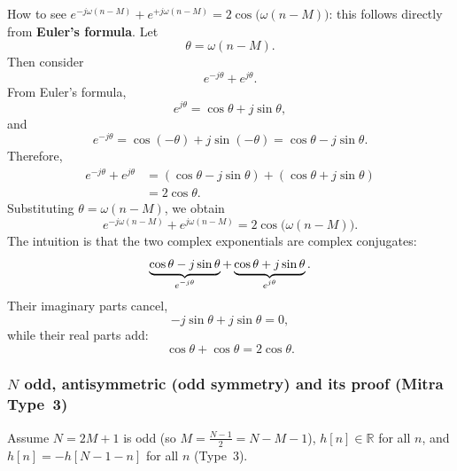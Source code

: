 \documentclass[handout_subfiles_root.tex]{subfiles}
\begin{document}
\begin{notebox}[title=\HandoutEulerAddendumNoteTitle]
How to see $e^{-j\omega(n-M)} + e^{+j\omega(n-M)} = 2\cos\bigl(\omega(n-M)\bigr)$: this follows directly from \textbf{Euler's formula}. Let
\begin{equation*}
\theta = \omega(n-M).
\end{equation*}
Then consider
\begin{equation*}
e^{-j\theta} + e^{j\theta}.
\end{equation*}
From Euler's formula,
\begin{equation*}
e^{j\theta} = \cos\theta + j\sin\theta,
\end{equation*}
and
\begin{equation*}
e^{-j\theta}
= \cos(-\theta) + j\sin(-\theta)
= \cos\theta - j\sin\theta.
\end{equation*}
Therefore,
\begin{align*}
e^{-j\theta} + e^{j\theta}
&= (\cos\theta - j\sin\theta)
 + (\cos\theta + j\sin\theta) \\
&= 2\cos\theta.
\end{align*}
Substituting $\theta = \omega(n-M)$, we obtain
\begin{equation*}
\boxed{
e^{-j\omega(n-M)}
+
e^{j\omega(n-M)}
=
2\cos\bigl(\omega(n-M)\bigr)
}.
\end{equation*}
The intuition is that the two complex exponentials are complex conjugates:
\begin{equation*}
\underbrace{\cos\theta-j\sin\theta}_{\HandoutUnderbraceLabel{e^{-j\theta}}}
+
\underbrace{\cos\theta+j\sin\theta}_{\HandoutUnderbraceLabel{e^{j\theta}}}.
\end{equation*}
Their imaginary parts cancel,
\begin{equation*}
-j\sin\theta+j\sin\theta=0,
\end{equation*}
while their real parts add:
\begin{equation*}
\cos\theta+\cos\theta=2\cos\theta.
\end{equation*}
\end{notebox}

\subsubsection{$N$ odd, antisymmetric (odd symmetry) and its proof (Mitra Type~3)}
\noindent Assume $N = 2M+1$ is odd (so $M = \tfrac{N-1}{2} = N-M-1$), $h[n]\in\mathbb{R}$ for all $n$, and $h[n] = -h[N-1-n]$ for all $n$ (Type~3).
\end{document}

